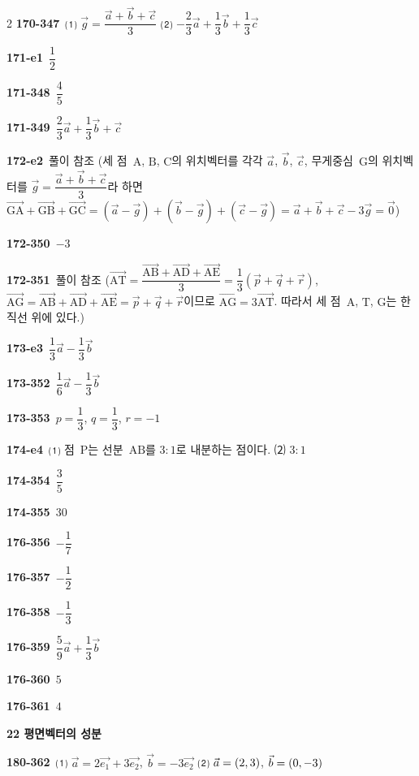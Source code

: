 \documentclass[10pt,a4paper]{article}
\newcommand{\pt}[1]{\mathrm{#1}}
\newcommand{\vecAB}[1]{\overrightarrow{\mathrm{#1}}}
\begin{document}
\begin{multicols}{2}
\noindent\textbf{170-347}\ ⑴ $\vec{g}=\dfrac{\vec{a}+\vec{b}+\vec{c}}{3}$ ⑵ $-\dfrac{2}{3}\vec{a}+\dfrac{1}{3}\vec{b}+\dfrac{1}{3}\vec{c}$\par
\noindent\textbf{171-e1}\ $\dfrac{1}{2}$\par
\noindent\textbf{171-348}\ $\dfrac{4}{5}$\par
\noindent\textbf{171-349}\ $\dfrac{2}{3}\vec{a}+\dfrac{1}{3}\vec{b}+\vec{c}$\par
\noindent\textbf{172-e2}\ 풀이 참조 (세 점~$\pt{A}$, $\pt{B}$, $\pt{C}$의 위치벡터를 각각 $\vec{a}$, $\vec{b}$, $\vec{c}$, 무게중심~$\pt{G}$의 위치벡터를 $\vec{g}=\dfrac{\vec{a}+\vec{b}+\vec{c}}{3}$라 하면 $\vecAB{GA}+\vecAB{GB}+\vecAB{GC}=(\vec{a}-\vec{g})+(\vec{b}-\vec{g})+(\vec{c}-\vec{g})=\vec{a}+\vec{b}+\vec{c}-3\vec{g}=\vec{0}$)\par
\noindent\textbf{172-350}\ $-3$\par
\noindent\textbf{172-351}\ 풀이 참조 ($\vecAB{AT}=\dfrac{\vecAB{AB}+\vecAB{AD}+\vecAB{AE}}{3}=\dfrac{1}{3}(\vec{p}+\vec{q}+\vec{r})$, $\vecAB{AG}=\vecAB{AB}+\vecAB{AD}+\vecAB{AE}=\vec{p}+\vec{q}+\vec{r}$이므로 $\vecAB{AG}=3\vecAB{AT}$. 따라서 세 점~$\pt{A}$, $\pt{T}$, $\pt{G}$는 한 직선 위에 있다.)\par
\noindent\textbf{173-e3}\ $\dfrac{1}{3}\vec{a}-\dfrac{1}{3}\vec{b}$\par
\noindent\textbf{173-352}\ $\dfrac{1}{6}\vec{a}-\dfrac{1}{3}\vec{b}$\par
\noindent\textbf{173-353}\ $p=\dfrac{1}{3}$, $q=\dfrac{1}{3}$, $r=-1$\par
\noindent\textbf{174-e4}\ ⑴ 점~$\pt{P}$는 선분~$\pt{AB}$를 $3:1$로 내분하는 점이다. ⑵ $3:1$\par
\noindent\textbf{174-354}\ $\dfrac{3}{5}$\par
\noindent\textbf{174-355}\ $30$\par
\noindent\textbf{176-356}\ $-\dfrac{1}{7}$\par
\noindent\textbf{176-357}\ $-\dfrac{1}{2}$\par
\noindent\textbf{176-358}\ $-\dfrac{1}{3}$\par
\noindent\textbf{176-359}\ $\dfrac{5}{9}\vec{a}+\dfrac{1}{3}\vec{b}$\par
\noindent\textbf{176-360}\ $5$\par
\noindent\textbf{176-361}\ $4$\par
\noindent\textbf{22 평면벡터의 성분}\par\smallskip
\noindent\textbf{180-362}\ ⑴ $\vec{a}=2\vec{e_1}+3\vec{e_2}$, $\vec{b}=-3\vec{e_2}$ ⑵ $\vec{a}=(2{,}\mkern3mu\mathopen{}3)$, $\vec{b}=(0{,}\mkern3mu\mathopen{}-3)$\par

\end{multicols}
\end{document}
